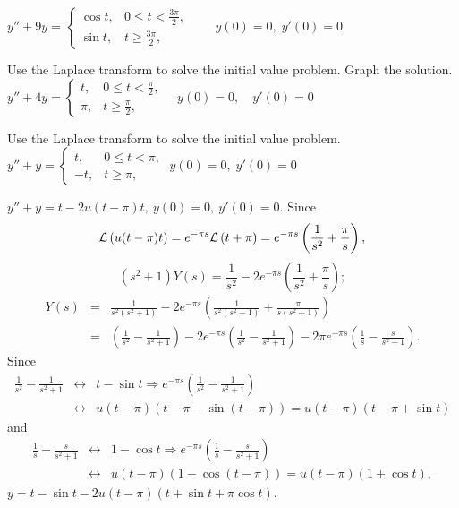\documentclass{ximera}
\begin{document}
\begin{problem}\label{exer:8.5.8} $y''+9y= \left\{\begin{array}{cl} \cos
t,&0\le t<\frac{3\pi}{2},\\ \sin
t,&t\ge\frac{3\pi}{2},\end{array}\right.\qquad y(0)=0,\;  y'(0)=0$
\end{problem}

\begin{problem}\label{exer:8.5.9} Use the Laplace transform to solve the initial value problem.  Graph the solution. 
$y''+4y= \left\{\begin{array}{cl} t,&0\le
t<\frac{\pi}{2},\\ \pi,&t\ge\frac{\pi}{2},
\end{array}\right.\quad y(0)=0,\quad y'(0)=0$
\end{problem}

\begin{problem}\label{exer:8.5.10}
Use the Laplace transform to solve the initial value problem.
$y''+y=\left\{\begin{array}{cl}t,&0\le t<\pi,
\\ -t,&t\ge\pi ,\end{array}\right.\;  y(0)=0,\;  y'(0)=0$

\begin{solution}
$y''+y=t-2u(t-\pi)t,\ y(0)=0,\ y'(0)=0$.
Since
$$
{\cal L}\left(u(t-\pi)t\right)=e^{-\pi s}{\cal L}\left(t+\pi\right)
=e^{-\pi s}\left(\frac{1}{s^2}+\frac{\pi}{s}\right),
$$
$$
(s^2+1)Y(s)=\frac{1}{s^2}-2e^{-\pi s}\left(\frac{1}{s^2}+\frac{\pi}{s}\right);
$$
\begin{eqnarray*}
Y(s)&=& \frac{1}{s^2(s^2+1)}-2e^{-\pi s}\left(\frac{1}{s^2(s^2+1)}+\frac{\pi}{s(s^2+1)}\right)\\ &=&\left(\frac{1}{s^2}-\frac{1}{s^2+1}\right)-2e^{-\pi s} \left(\frac{1}{s^2}-\frac{1}{s^2+1}\right)-2\pi e^{-\pi s}\left(\frac{1}{s}-\frac{s}{s^2+1}\right).
\end{eqnarray*}
Since
\begin{eqnarray*}
\frac{1}{s^2}-\frac{1}{s^2+1}&\leftrightarrow& t-\sin t\Rightarrow
e^{-\pi s}\left(\frac{1}{s^2}-\frac{1}{s^2+1}\right)\\ &\leftrightarrow&
u(t-\pi)\left(t-\pi-\sin(t-\pi)\right)=u(t-\pi)(t-\pi+\sin t)
\end{eqnarray*}
and
\begin{eqnarray*}
\frac{1}{s}-\frac{s}{s^2+1}&\leftrightarrow& 1-\cos t\Rightarrow
e^{-\pi s}\left(\frac{1}{s}-\frac{s}{s^2+1}\right)\\ &\leftrightarrow&
u(t-\pi)\left(1-\cos(t-\pi)\right)=u(t-\pi)(1+\cos t),
\end{eqnarray*}
 $y=t-\sin t-2u(t-\pi)(t+\sin t+\pi\cos t)$.
\end{solution}
\end{problem}
\end{document}
